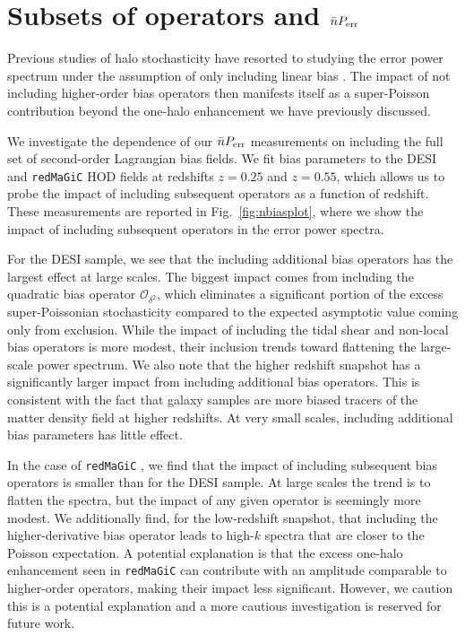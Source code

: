 \documentclass[fleqn,usenatbib]{mnras}
\newcommand{\redmagic}{\texttt{redMaGiC} }
\begin{document}
\section{Subsets of operators and $\bar{n}P_{\rm err}$}
\label{appendix:D}
Previous studies of halo stochasticity have resorted to studying the error power spectrum under the assumption of only including linear bias \citep{Hamaus_2010, Baldauf_2013}. The impact of not including higher-order bias operators then manifests itself as a super-Poisson contribution beyond the one-halo enhancement we have previously discussed. \par 
We investigate the dependence of our $\bar{n}P_{\rm err}$ measurements on including the full set of second-order Lagrangian bias fields. We fit bias parameters to the DESI and \redmagic HOD fields at redshifts $z=0.25$ and $z=0.55$, which allows us to probe the impact of including subsequent operators as a function of redshift. These measurements are reported in Fig.~\ref{fig:nbiasplot}, where we show the impact of including subsequent operators in the error power spectra. \par 
For the DESI sample, we see that the including additional bias operators has the largest effect at large scales. The biggest impact comes from including the quadratic bias operator $\mathcal{O}_{\delta^2}$, which eliminates a significant portion of the excess super-Poissonian stochasticity compared to the expected asymptotic value coming only from exclusion. While the impact of including the tidal shear and non-local bias operators is more modest, their inclusion trends toward flattening the large-scale power spectrum. We also note that the higher redshift snapshot has a significantly larger impact from including additional bias operators. This is consistent with the fact that galaxy samples are more biased tracers of the matter density field at higher redshifts. At very small scales, including additional bias parameters has little effect. \par 
In the case of \redmagic, we find that the impact of including subsequent bias operators is smaller than for the DESI sample. At large scales the trend is to flatten the spectra, but the impact of any given operator is seemingly more modest. We additionally find, for the low-redshift snapshot, that including the higher-derivative bias operator leads to high-$k$ spectra that are closer to the Poisson expectation. A potential explanation is that the excess one-halo enhancement seen in \redmagic can contribute with an amplitude comparable to higher-order operators, making their impact less significant. However, we caution this is a potential explanation and a more cautious investigation is reserved for future work. \par 
\end{document}
